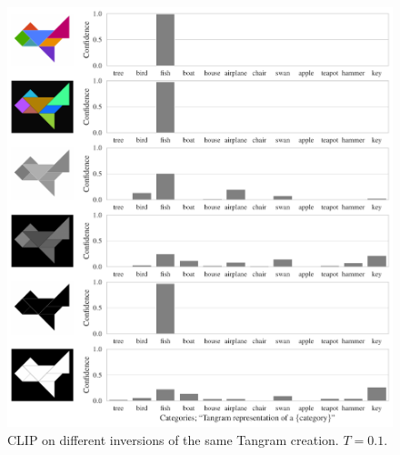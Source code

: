 \begin{figure}[H]
    \centering
    \includegraphics[width=\textwidth]{images/tangram_fish_10.pdf}
    \caption{CLIP on different inversions of the same Tangram creation. \(T = 0.1\).}
    \label{fig:clip-tangram-inversions}
\end{figure}



